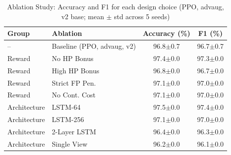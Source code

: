 \begin{table}[h]
\centering
\caption{Ablation Study: Accuracy and F1 for each design choice (PPO, advaug, v2 base; mean $\pm$ std across 5 seeds)}
\label{tab:ablations}
\begin{tabular}{llcc}
\toprule
Group & Ablation & Accuracy (\%) & F1 (\%) \\
\midrule
  -- & Baseline (PPO, advaug, v2) & 96.8$\pm$0.7 & 96.7$\pm$0.7 \\
\midrule
  Reward & No HP Bonus & 97.4$\pm$0.0 & 97.3$\pm$0.0 \\
  Reward & High HP Bonus & 96.8$\pm$0.0 & 96.7$\pm$0.0 \\
  Reward & Strict FP Pen. & 97.1$\pm$0.0 & 97.0$\pm$0.0 \\
  Reward & No Cont. Cost & 97.1$\pm$0.0 & 97.0$\pm$0.0 \\
\midrule
  Architecture & LSTM-64 & 97.5$\pm$0.0 & 97.4$\pm$0.0 \\
  Architecture & LSTM-256 & 97.1$\pm$0.0 & 97.0$\pm$0.0 \\
  Architecture & 2-Layer LSTM & 96.4$\pm$0.0 & 96.3$\pm$0.0 \\
  Architecture & Single View & 96.2$\pm$0.0 & 96.1$\pm$0.0 \\
\midrule
\bottomrule
\end{tabular}
\end{table}